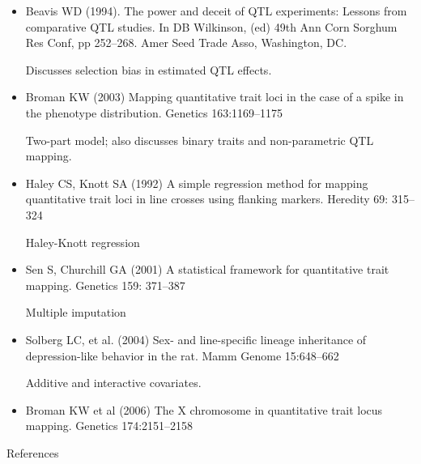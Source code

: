 \documentclass[12pt]{article}
\newcommand{\headsize}{\fontsize{35}{35} \selectfont}
\newcommand{\smallestsize}{\fontsize{18}{22} \selectfont}
\begin{document}
\hspace*{0.5in}
\begin{minipage}{9.5in}
\begin{itemize}
\itemsep8pt
\item Beavis WD (1994). The power and deceit of QTL experiments:
  Lessons from comparative QTL studies. In DB Wilkinson,
  (ed) 49th Ann Corn Sorghum Res Conf, pp
  252--268. Amer Seed Trade Asso, Washington, DC.

{\color{myblue} Discusses selection bias in estimated QTL effects.}

\item Broman KW (2003) Mapping quantitative trait loci in the case of
  a spike in the phenotype distribution. Genetics 163:1169--1175

{\color{myblue} Two-part model; also discusses binary traits and
  non-parametric QTL mapping.}

\item Haley CS, Knott SA (1992) A simple regression method for mapping
  quantitative trait loci in line crosses using flanking
  markers. Heredity 69: 315--324

{\color{myblue} Haley-Knott regression}

\item Sen S, Churchill GA (2001) A statistical framework for
  quantitative trait mapping. Genetics 159: 371--387

{\color{myblue} Multiple imputation}

\item Solberg LC, et al. (2004) Sex- and line-specific lineage
  inheritance of depression-like behavior in the rat. Mamm Genome
  15:648--662

{\color{myblue} Additive and interactive covariates.}

\item Broman KW et al (2006) The X chromosome in quantitative trait
  locus mapping. Genetics 174:2151--2158

\end{itemize}
\end{minipage}


\newpage

\headsize \color{myyellow}
\hfill \begin{minipage}{5.75in}
\centering
References
\end{minipage}

\vspace*{15mm}

\color{mywhite} \smallestsize
\end{document}
